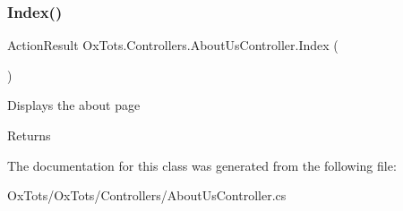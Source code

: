 \subsubsection{\texorpdfstring{Index()}{Index()}}
{\footnotesize\ttfamily Action\+Result Ox\+Tots.\+Controllers.\+About\+Us\+Controller.\+Index (\begin{DoxyParamCaption}{ }\end{DoxyParamCaption})\hspace{0.3cm}{\ttfamily [inline]}}



Displays the about page 

\begin{DoxyReturn}{Returns}

\end{DoxyReturn}


The documentation for this class was generated from the following file\+:\begin{DoxyCompactItemize}
\item 
Ox\+Tots/\+Ox\+Tots/\+Controllers/About\+Us\+Controller.\+cs\end{DoxyCompactItemize}
